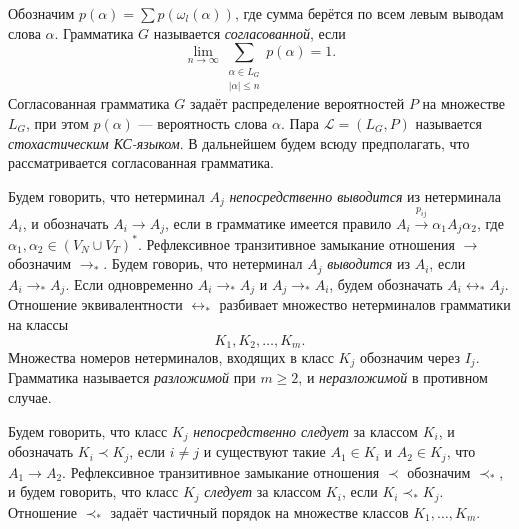 \documentclass[12pt]{article}
\begin{document}
\begin{footnotesize}

\end{footnotesize}

\hrulefill

Обозначим $p(\alpha) = \sum p(\omega_l(\alpha))$, где сумма берётся по всем левым выводам слова $\alpha$. Грамматика $G$ называется \textit{согласованной}, если
\begin{equation}
\label{eq:soglas}
	\lim_{n \rightarrow \infty} \sum_{\substack{\alpha \in L_G\\\left|\alpha\right| \leq n}} p(\alpha) = 1.
\end{equation}
Согласованная грамматика $G$ задаёт распределение вероятностей $P$ на множестве $L_G$, при этом $p(\alpha)$ --- вероятность слова $\alpha$. Пара $\mathcal{L} = (L_G, P)$ называется \textit{стохастическим КС-языком}. В дальнейшем будем всюду предполагать, что рассматривается согласованная грамматика.

Будем говорить, что нетерминал $A_j$ \textit{непосредственно выводится} из нетерминала $A_i$, и обозначать $A_i \rightarrow A_j$, если в грамматике имеется правило $A_i \xrightarrow{p_{ij}} \alpha_1 A_j \alpha_2$, где $\alpha_1, \alpha_2 \in (V_N \cup V_T)^*$. Рефлексивное транзитивное замыкание отношения $\rightarrow$ обозначим $\rightarrow_*$. Будем говориь, что нетерминал $A_j$ \textit{выводится} из $A_i$, если $A_i \rightarrow_* A_j$. Если одновременно $A_i \rightarrow_* A_j$ и $A_j \rightarrow_* A_i$, будем обозначать $A_i \leftrightarrow_* A_j$. Отношение эквивалентности $\leftrightarrow_*$ разбивает множество нетерминалов грамматики на классы
\begin{equation}
	K_1, K_2, \ldots, K_m.
\end{equation}
Множества номеров нетерминалов, входящих в класс $K_j$ обозначим через $I_j$. Грамматика называется \textit{разложимой} при $m \geq 2$, и \textit{неразложимой} в противном случае.

Будем говорить, что класс $K_j$ \textit{непосредственно следует} за классом $K_i$, и обозначать $K_i \prec K_j$, если $i \neq j$ и существуют такие $A_1 \in K_i$ и $A_2 \in K_j$, что $A_1 \rightarrow A_2$. Рефлексивное транзитивное замыкание отношения $\prec$ обозначим $\prec_*$, и будем говорить, что класс $K_j$ \textit{следует} за классом $K_i$, если $K_i \prec_* K_j$. Отношение $\prec_*$ задаёт частичный порядок на множестве классов $K_1, \ldots, K_m$.
\end{document}
